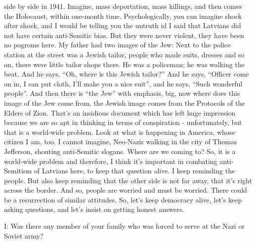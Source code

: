 side by side in 1941. Imagine, mass deportation, mass killings, and then comes the Holocaust, within one-month time. Psychologically, you can imagine shock after shock, and I would be telling you the untruth id I said that Latvians did not have certain anti-Semitic bias. But they were never violent, they have been no pogroms here. My father had two images of the Jew: Next to the police station at the street was a Jewish tailor, people who made suits, dresses and so on, there were little tailor shops there. He was a policeman; he was walking the beat. And he says, “Oh, where is this Jewish tailor?” And he says, “Officer come on in, I can put cloth, I’ll make you a nice suit”, and he says, “Such wonderful people”. And then there is “the Jew” with emphasis, big, now where does this image of the Jew come from, the Jewish image comes from the Protocols of the Elders of Zion. That’s an insidious document which has left huge impression because we are so apt in thinking in terms of conspiration - unfortunately, but that is a world-wide problem. Look at what is happening in America, whose citizen I am, too. I cannot imagine, Neo-Nazis walking in the city of Thomas Jefferson, shouting anti-Semitic slogans. Where are we coming to? So, it is a world-wide problem and therefore, I think it’s important in combating anti-Semitism of Latvians here, to keep that question alive. I keep reminding the people. But also keep reminding that the other side is not far away, that it’s right across the border. And so, people are worried and must be worried. There could be a resurrection of similar attitudes. So, let’s keep democracy alive, let’s keep asking questions, and let’s insist on getting honest answers.

I: Was there any member of your family who was forced to serve at the Nazi or Soviet army?

